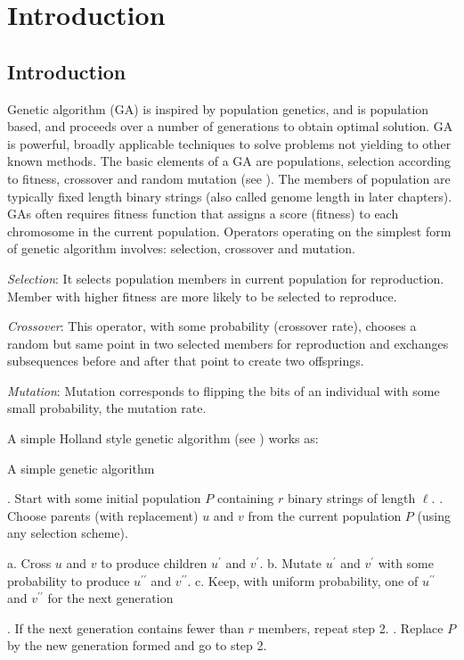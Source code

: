 \chapter{Introduction} \label{ch:introduction}

\section{Introduction}
Genetic algorithm (GA) is inspired by population genetics, and is population based, and 
proceeds over a number of generations to obtain optimal solution. GA is powerful, broadly applicable 
techniques to solve problems not yielding to other known methods. The basic elements of a GA are
populations, selection according to fitness, crossover and random mutation (see \cite{Mitchell1999}). 
The members of population are typically fixed length binary strings (also called genome length in later chapters).  
GAs often requires fitness function that assigns a score (fitness) to each chromosome 
in the current population. Operators operating on the simplest form of genetic algorithm involves: selection, crossover and mutation.

\textit{Selection}: It selects population members in current population for reproduction. 
Member with higher fitness are more likely to be selected to reproduce.

\textit{Crossover}: This operator, with some probability (crossover rate), chooses a random but same point in two selected members for reproduction 
and exchanges subsequences before and after that point to create two offsprings.

\textit{Mutation}: Mutation corresponds to flipping the bits of an individual with some small probability, 
the mutation rate.

A simple Holland style genetic algorithm (see \cite{Holland1975}) works as:
\begin{algorithm}
\label{realGA}
\caption*{A simple genetic algorithm}
\begin{algorithmic}[1]
. Start with some initial population $P$ containing $r$ binary strings of length $\ell$.
. Choose parents (with replacement) $u$ and $v$ from the current population $P$ (using any selection scheme).

  \Statex \hspace{\algorithmicindent} a. Cross $u$ and $v$ to produce children $u^\prime$ and $v^\prime$.
  \Statex \hspace{\algorithmicindent} b. Mutate $u^\prime$ and $v^\prime$ with some probability to produce $u^{\prime\prime}$ and $v^{\prime\prime}$.
  \Statex \hspace{\algorithmicindent} c. Keep, with uniform probability, one of $u^{\prime\prime}$ and $v^{\prime\prime}$ for the next generation
 
. If the next generation contains fewer than $r$ members, repeat step 2.
. Replace $P$ by the new generation formed and go to step 2.
\end{algorithmic}
\end{algorithm}

